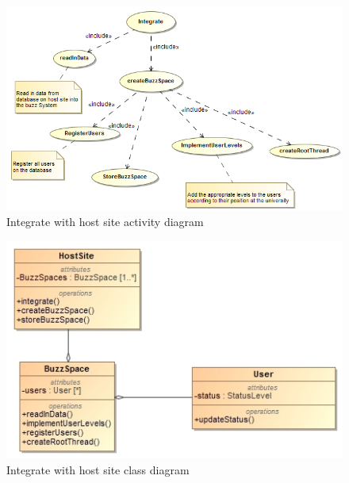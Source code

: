 \documentclass[11pt]{article}
\begin{document}
\begin{enumerate}
\graphicspath{ {../Diagrams/Maret/activity/} }
	\begin{figure}[H]	
    	\includegraphics[scale=0.5]{Integrate.png}
    	\caption{Integrate with host site activity diagram}
	\end{figure}
\graphicspath{ {../Diagrams/Maret/class/} }
	\begin{figure}[H]	
    	\includegraphics[scale=0.5]{Integrate.jpg}
    	\caption{Integrate with host site class diagram}
	\end{figure}
	

\end{enumerate}
\end{document}
